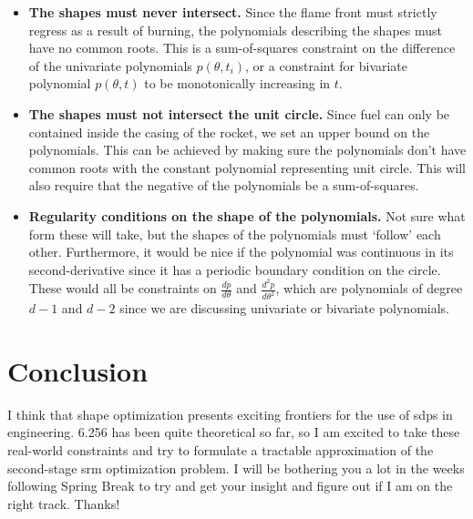 \documentclass[11pt]{article}
\begin{document}
\begin{itemize}
\item \textbf{The shapes must never intersect.} Since the flame front must strictly regress as a result of burning, the polynomials describing the shapes must have no common roots. This is a sum-of-squares constraint on the difference of the univariate polynomials $p(\theta, t_i)$, or a constraint for bivariate polynomial $p(\theta, t)$ to be monotonically increasing in $t$.
\item\textbf{The shapes must not intersect the unit circle.} Since fuel can only be contained inside the casing of the rocket, we set an upper bound on the polynomials. This can be achieved by making sure the polynomials don't have common roots with the constant polynomial representing unit circle. This will also require that the negative of the polynomials be a sum-of-squares. 
\item \textbf{Regularity conditions on the shape of the polynomials.} Not sure what form these will take, but the shapes of the polynomials must `follow' each other. Furthermore, it would be nice if the polynomial was continuous in its second-derivative since it has a periodic boundary condition on the circle. These would all be constraints on $\frac{dp}{d\theta}$ and $\frac{d^2p}{d\theta^2}$, which are polynomials of degree $d-1$ and $d-2$ since we are discussing univariate or bivariate polynomials. 
\end{itemize}

\section{Conclusion}

I think that shape optimization presents exciting frontiers for the use of \gls{sdp}s in engineering.
    6.256 has been quite theoretical so far, so I am excited to take these real-world constraints and
    try to formulate a tractable approximation of the second-stage \gls{srm} optimization problem.
    I will be bothering you a lot in the weeks following Spring Break to try and get your insight and figure
    out if I am on the right track. Thanks!
\end{document}
